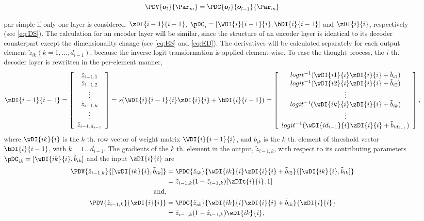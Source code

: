 \begin{equation*}
  \PDV{\oi{l}}{\Par_m} = \PDC{\oi{l}}{\oi{l-1}}{\Par_m}
\end{equation*}

 par simple if only one layer is considered. $\zDI{i-1}{i-1}$, $\pDC_{i}=[\WDI{i}{i-1}{i}, \bDI{i}{i-1}]$ and $\zDI{i}{i}$, respectively (see \ref{eq:DS}). The calculation for an encoder layer will be similar, since the structure of an encoder layer is identical to its decoder counterpart except the dimensionality change (see \ref{eq:ES} and \ref{eq:ED}). The derivatives will be calculated separately for each output element $\tilde{z}_{ik} (k=1,\dots,d_{i-1})$, because the inverse logit transformation is applied element-wise. To ease the thought process, the $i$ th. decoder layer is rewritten in the per-element manner,
\begin{equation*}
  \zDI{i-1}{i-1} = 
  \left[\begin{array}{c}
      \tilde{z}_{i-1,1} \\ 
      \tilde{z}_{i-1,2} \\ \vdots \\
      \tilde{z}_{i-1,k} \\ \vdots \\
      \tilde{z}_{i-1,d_{i-1}}
    \end{array}\right]
  = s(\WDI{i}{i-1}{i} \zDI{i}{i} + \bDI{i}{i-1})
  = \left[ \begin{array}{c}
      logit^{-1}(\wDI{i1}{i} \zDI{i}{i} + \tilde{b}_{i1}) \\
      logit^{-1}(\wDI{i2}{i} \zDI{i}{i} + \tilde{b}_{i2}) \\ \vdots \\
      logit^{-1}(\wDI{ik}{i} \zDI{i}{i} + \tilde{b}_{ik}) \\ \vdots \\
      logit^{-1}(\wDI{id_{i-1}}{i} \zDI{i}{i} + \tilde{b}_{id_{i-1}}) \\
    \end{array} \right],
\end{equation*}
where $\wDI{ik}{i}$ is the $k$ th. row vector of weight matrix $\WDI{i}{i-1}{i}$, and $\tilde{b}_{ik}$ is the $k$ th. element of threshold vector $\bDI{i}{i-1}$, with $k=1 \dots d_{i-1}$. The gradients of the $k$ th. element in the output, $\tilde{z}_{i-1,k}$, with respect to its contributing parameters $\pDC_{ik}=[\wDI{ik}{i}, \tilde{b}_{ik}]$ and the input $\zDI{i}{i}$ are
\begin{equation*}
  \begin{split}
    \PDV{\tilde{z}_{i-1,k}}{[\wDI{ik}{i}, \tilde{b}_{ik}]}
    &= \PDC{\tilde{z}_{ik}}{\wDI{ik}{i} \zDI{i}{i} + \tilde{b}_{i2}}{[\wDI{ik}{i}, \tilde{b}_{ik}]} \\
    &= \tilde{z}_{i-1,k}(1-\tilde{z}_{i-1,k})[\zDIt{i}{i},1] \\
    \text{and,} & \\
    \PDV{\tilde{z}_{i-1,k}}{\zDI{i}{i}}
    &= \PDC{\tilde{z}_{ik}}{\wDI{ik}{i} \zDI{i}{i} + \tilde{b}_{ik}}{\zDI{i}{i}} \\
    &= \tilde{z}_{i-1,k}(1-\tilde{z}_{i-1,k})\wDI{ik}{i},
  \end{split}
\end{equation*}
